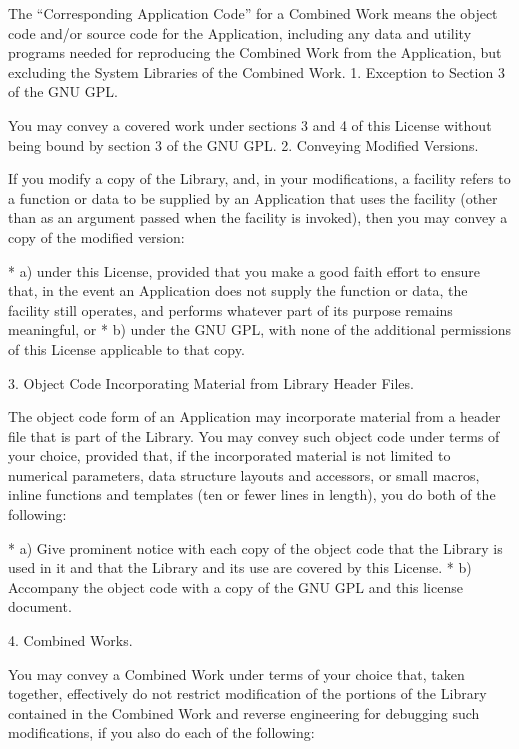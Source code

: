 {\begin{multicols}{4}
The “Corresponding Application Code” for a Combined Work means the object code and/or source code for the Application, including any data and utility programs needed for reproducing the Combined Work from the Application, but excluding the System Libraries of the Combined Work.
1. Exception to Section 3 of the GNU GPL.

You may convey a covered work under sections 3 and 4 of this License without being bound by section 3 of the GNU GPL.
2. Conveying Modified Versions.

If you modify a copy of the Library, and, in your modifications, a facility refers to a function or data to be supplied by an Application that uses the facility (other than as an argument passed when the facility is invoked), then you may convey a copy of the modified version:

    * a) under this License, provided that you make a good faith effort to ensure that, in the event an Application does not supply the function or data, the facility still operates, and performs whatever part of its purpose remains meaningful, or
    * b) under the GNU GPL, with none of the additional permissions of this License applicable to that copy.

3. Object Code Incorporating Material from Library Header Files.

The object code form of an Application may incorporate material from a header file that is part of the Library. You may convey such object code under terms of your choice, provided that, if the incorporated material is not limited to numerical parameters, data structure layouts and accessors, or small macros, inline functions and templates (ten or fewer lines in length), you do both of the following:

    * a) Give prominent notice with each copy of the object code that the Library is used in it and that the Library and its use are covered by this License.
    * b) Accompany the object code with a copy of the GNU GPL and this license document.

4. Combined Works.

You may convey a Combined Work under terms of your choice that, taken together, effectively do not restrict modification of the portions of the Library contained in the Combined Work and reverse engineering for debugging such modifications, if you also do each of the following:


\end{multicols}}
